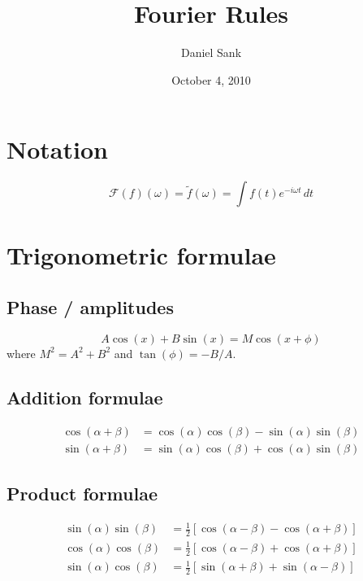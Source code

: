 \documentclass{article}
\author{Daniel Sank}
\title{Fourier Rules}
\date{October 4, 2010}
\begin{document}
\maketitle
\tableofcontents

\section{Notation}

\begin{equation*}
  \mathcal{F}(f)(\omega) = \tilde{f}(\omega) = \int f(t) e^{-i \omega t} \, dt
\end{equation*}

\section{Trigonometric formulae}

\subsection*{Phase / amplitudes}
\begin{equation}
  A \cos(x) + B \sin(x) = M \cos(x+\phi)
\end{equation}
where $M^{2} = A^{2}+B^{2}$ and $\tan(\phi) = -B / A$.

\subsection*{Addition formulae}

\begin{align*}
  \cos ( \alpha + \beta ) & =
    \cos ( \alpha ) \cos ( \beta ) - \sin ( \alpha ) \sin ( \beta ) \\
  \sin ( \alpha + \beta ) & =
    \sin ( \alpha ) \cos ( \beta ) + \cos ( \alpha ) \sin ( \beta )
\end{align*}

\subsection*{Product formulae}

\begin{align*}
  \sin(\alpha) \sin(\beta) & =
    \frac{1}{2} \left[ \cos (\alpha - \beta) - \cos(\alpha + \beta) \right] \\
  \cos(\alpha) \cos(\beta) & =
    \frac{1}{2} \left[ \cos (\alpha - \beta) + \cos(\alpha + \beta) \right]\\
  \sin(\alpha) \cos(\beta) &=
    \frac{1}{2} \left[ \sin (\alpha + \beta) + \sin(\alpha - \beta) \right]
\end{align*}
\end{document}
